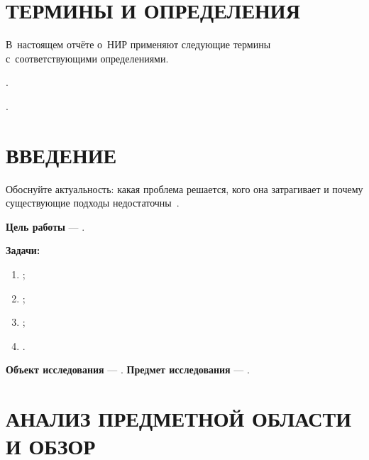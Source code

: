\documentclass[12pt,a4paper]{extreport}
\begin{document}
\chapter*{ТЕРМИНЫ И ОПРЕДЕЛЕНИЯ}
В~настоящем отчёте о~НИР применяют следующие термины с~соответствующими
определениями.

\begin{description}[leftmargin=0pt, labelindent=0pt, font=\bfseries, style=nextline]
  \item[\hseFill{Термин 1}] .
  \item[\hseFill{Термин 2}] .
\end{description}

\clearpage
\chapter*{ВВЕДЕНИЕ}
Обоснуйте актуальность: какая проблема решается, кого она затрагивает и
почему существующие подходы недостаточны~\cite{gost732}.

\textbf{Цель работы} — .

\textbf{Задачи:}
\begin{enumerate}[label=\arabic*), leftmargin=1.25cm]
  \item {};
  \item {};
  \item {};
  \item {}.
\end{enumerate}

\textbf{Объект исследования} — .
\textbf{Предмет исследования} — .

\clearpage
\chapter{АНАЛИЗ ПРЕДМЕТНОЙ ОБЛАСТИ И ОБЗОР}
\end{document}
